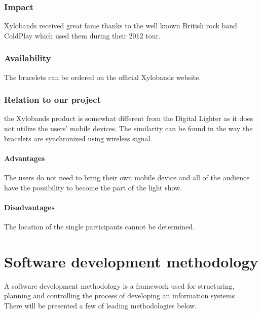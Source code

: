 \subsubsection{Impact}
Xylobands received great fame thanks to the well known British rock band ColdPlay which used them during their 2012 tour.

\subsubsection{Availability}
The bracelets can be ordered on the official Xylobands website.

\subsubsection{Relation to our project}
the Xylobands product is somewhat different from the Digital Lighter as it does not utilize the users' mobile devices. 
The similarity can be found in the way the bracelets are synchronized using wireless signal. 

\paragraph{Advantages}
The users do not need to bring their own mobile device and all of the audience have the possibility to become the part of the light show.

\paragraph{Disadvantages}
The location of the single participants cannot be determined.



\section{Software development methodology}
A software development methodology is a framework used for structuring, planning and controlling the process of developing an information systems \cite{selectingMethodology}.
There will be presented a few of leading methodologies below. 

